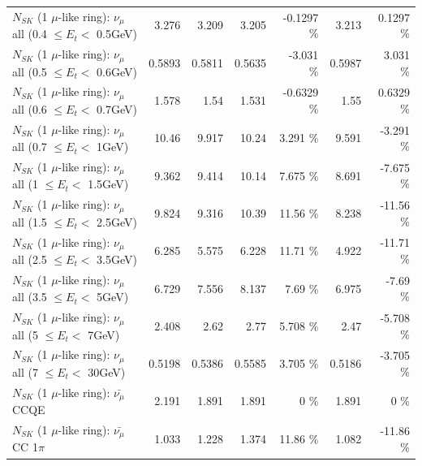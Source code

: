 \begin{table}
\begin{tabular}{| l | r | r | r  r | r  r |}
       $N_{SK}$ (1 $\mu$-like ring): $\nu_{\mu}$ all (0.4 $\leq E_{t} <$ 0.5GeV) &           3.276 &           3.209 &           3.205 &  -0.1297 \%  &           3.213 &   0.1297 \%  \\ 
       $N_{SK}$ (1 $\mu$-like ring): $\nu_{\mu}$ all (0.5 $\leq E_{t} <$ 0.6GeV) &          0.5893 &          0.5811 &          0.5635 &   -3.031 \%  &          0.5987 &    3.031 \%  \\ 
       $N_{SK}$ (1 $\mu$-like ring): $\nu_{\mu}$ all (0.6 $\leq E_{t} <$ 0.7GeV) &           1.578 &            1.54 &           1.531 &  -0.6329 \%  &            1.55 &   0.6329 \%  \\ 
         $N_{SK}$ (1 $\mu$-like ring): $\nu_{\mu}$ all (0.7 $\leq E_{t} <$ 1GeV) &           10.46 &           9.917 &           10.24 &    3.291 \%  &           9.591 &   -3.291 \%  \\ 
         $N_{SK}$ (1 $\mu$-like ring): $\nu_{\mu}$ all (1 $\leq E_{t} <$ 1.5GeV) &           9.362 &           9.414 &           10.14 &    7.675 \%  &           8.691 &   -7.675 \%  \\ 
       $N_{SK}$ (1 $\mu$-like ring): $\nu_{\mu}$ all (1.5 $\leq E_{t} <$ 2.5GeV) &           9.824 &           9.316 &           10.39 &    11.56 \%  &           8.238 &   -11.56 \%  \\ 
       $N_{SK}$ (1 $\mu$-like ring): $\nu_{\mu}$ all (2.5 $\leq E_{t} <$ 3.5GeV) &           6.285 &           5.575 &           6.228 &    11.71 \%  &           4.922 &   -11.71 \%  \\ 
         $N_{SK}$ (1 $\mu$-like ring): $\nu_{\mu}$ all (3.5 $\leq E_{t} <$ 5GeV) &           6.729 &           7.556 &           8.137 &     7.69 \%  &           6.975 &    -7.69 \%  \\ 
           $N_{SK}$ (1 $\mu$-like ring): $\nu_{\mu}$ all (5 $\leq E_{t} <$ 7GeV) &           2.408 &            2.62 &            2.77 &    5.708 \%  &            2.47 &   -5.708 \%  \\ 
          $N_{SK}$ (1 $\mu$-like ring): $\nu_{\mu}$ all (7 $\leq E_{t} <$ 30GeV) &          0.5198 &          0.5386 &          0.5585 &    3.705 \%  &          0.5186 &   -3.705 \%  \\ 
\hline
\hline
\hline
                              $N_{SK}$ (1 $\mu$-like ring): $\bar{\nu_\mu}$ CCQE &           2.191 &           1.891 &           1.891 &        0 \%  &           1.891 &        0 \%  \\ 
                         $N_{SK}$ (1 $\mu$-like ring): $\bar{\nu_\mu}$ CC 1$\pi$ &           1.033 &           1.228 &           1.374 &    11.86 \%  &           1.082 &   -11.86 \%  \\ 

\end{tabular}
\end{table}
